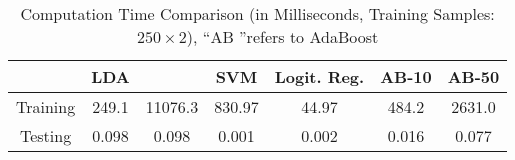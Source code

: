 \begin{table}
\begin{center}
\caption{Computation Time Comparison (in Milliseconds, Training Samples: $250\times 2$), ``AB ''refers to AdaBoost}
\label{tab:time-consuming}

\begin{tabular}{*{7}{c}}
\toprule
	&LDA&\TheName\ &SVM&Logit. Reg. & AB-10 & AB-50\\
	\midrule

Training  &	249.1	&  11076.3  &  830.97  &  44.97  &  484.2 & 2631.0  \\
\midrule

Testing   &	0.098	&  0.098   &  0.001    &  0.002  &  0.016 & 0.077  \\

\bottomrule
\end{tabular}
\end{center}
\end{table}



